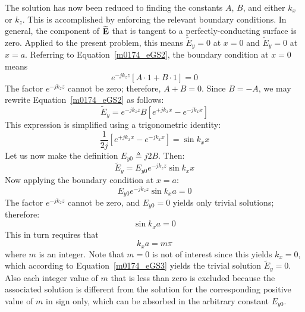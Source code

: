 The solution has now been reduced to finding the constants $A$, $B$, and either $k_x$ or $k_z$.
This is accomplished by enforcing the relevant boundary conditions.
In general, the component of $\widetilde{\bf E}$ that is tangent to a perfectly-conducting surface is zero.
Applied to the present problem, this means 
$\widetilde{E}_y = 0$ at $x=0$ and
$\widetilde{E}_y = 0$ at $x=a$.
Referring to Equation~\ref{m0174_eGS2}, the boundary condition at $x=0$ means
%
\begin{equation}
e^{-jk_z z} \left[ A \cdot 1 + B \cdot 1 \right] = 0
\end{equation} 
%
The factor $e^{-jk_z z}$ cannot be zero; therefore, $A+B=0$.
Since $B=-A$, we may rewrite Equation~\ref{m0174_eGS2} as follows:
%
\begin{equation}
\widetilde{E}_y = e^{-jk_z z} B \left[ e^{+jk_x x} - e^{-jk_x x} \right] 
\end{equation}
%
This expression is simplified using a trigonometric identity:
%
\begin{equation}
\frac{1}{2j}\left[ e^{+jk_x x} - e^{-jk_x x} \right] = \sin{k_x x} 
\end{equation} 
%
Let us now make the definition $E_{y0}\triangleq j2B$.  Then:
%
\begin{equation}
\widetilde{E}_y = E_{y0} e^{-jk_z z} \sin k_x x
\label{m0174_eGS3}
\end{equation}
%
Now applying the boundary condition at $x=a$:
%
\begin{equation}
E_{y0} e^{-jk_z z} \sin k_x a  = 0
\end{equation} 
%
The factor $e^{-jk_z z}$ cannot be zero, and $E_{y0}=0$ yields only trivial solutions; therefore: 
%
\begin{equation}
\sin{k_x a} = 0
\end{equation} 
%
This in turn requires that
%
\begin{equation}
k_x a = m \pi 
\label{m0174_ekxa}
\end{equation}
%
where $m$ is an integer.
Note that $m=0$ is not of interest since this yields $k_x=0$, which according to Equation~\ref{m0174_eGS3} yields the trivial solution $\widetilde{E}_y=0$.
Also each integer value of $m$ that is less than zero is excluded because the associated solution is different from the solution for the corresponding positive value of $m$ in sign only, which can be absorbed in the arbitrary constant $E_{y0}$.

